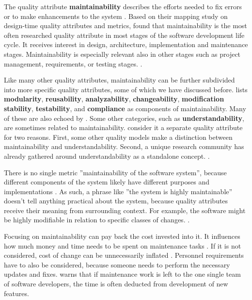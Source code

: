 \documentclass[utf8,english]{gradu3}
\begin{document}
The quality attribute \textbf{maintainability} describes the efforts needed to
fix errors or to make enhancements to the system \parencite[603]{Gorla2010}.
Based on their mapping study on design-time quality attributes and metrics,
\textcite{Arvanitou2017} found that maintainability is the most often researched
quality attribute in most stages of the software development life cycle. It
receives interest in design, architecture, implementation and maintenance
stages. Maintainability is especially relevant also in other stages such as project
management, requirements, or testing stages. \parencite[61-62]{Arvanitou2017}.

Like many other quality attributes, maintainability can be further subdivided
into more specific quality attributes, some of which we have discussed before.
\textcite[233]{ISO5055} lists \textbf{modularity}, \textbf{reusability}, \textbf{analyzability},
\textbf{changeability}, \textbf{modification stability}, \textbf{testability},
and \textbf{compliance} as components of maintainability. Many of these are also
echoed by \textcite[61]{Arvanitou2017}. Some other categories, such as
\textbf{understandability}, are sometimes related to maintainability.
\textcite{Arvanitou2017} consider it a separate quality attribute for two
reasons. First, some other quality models make a distinction between
maintainability and understandability. Second, a unique research community has
already gathered around understandability as a standalone concept.
\parencite[61]{Arvanitou2017}.

There is no single metric ''maintainability of the software system'', because
different components of the system likely have different purposes and implementations
\parencites[26]{Broy2006}[192]{Bass1998}. As such, a phrase like ''the system is
highly maintainable'' doesn't tell anything practical about the system, because
quality attributes receive their meaning from surrounding context. For example,
the software might be highly modifiable in relation to specific classes of
changes. \parencite[192]{Bass1998}.

Focusing on maintainability can pay back the cost invested into it. It
influences how much money and time needs to be spent on maintenance tasks
\parencite[21]{Broy2006}. If it is not considered, cost of change can be
unnecessarily inflated \parencite[2]{Vale2022}. Personnel requirements have to
also be considered, because someone needs to perform the necessary updates and
fixes. \textcite{Heroku2011} warns that if maintenance work is left to the one
single team of software developers, the time is often deducted from development
of new features.
\end{document}
